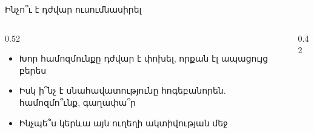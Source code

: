 \begin{frame}{Ինչո՞ւ է դժվար ուսումնասիրել}
  \begin{columns}[c]
    \begin{column}{0.52\textwidth}
      \begin{itemize}
        \item Խոր համոզմունքը դժվար է փոխել, որքան էլ ապացույց բերես
        \item<2-> Իսկ ի՞նչ է սնահավատությունը հոգեբանորեն. համոզմո՞ւնք, գաղափա՞ր
        \item<3-> Ինչպե՞ս կերևա այն ուղեղի ակտիվության մեջ
      \end{itemize}
    \end{column}
    \begin{column}{0.42\textwidth}
      \centering
    \end{column}
  \end{columns}
\end{frame}

